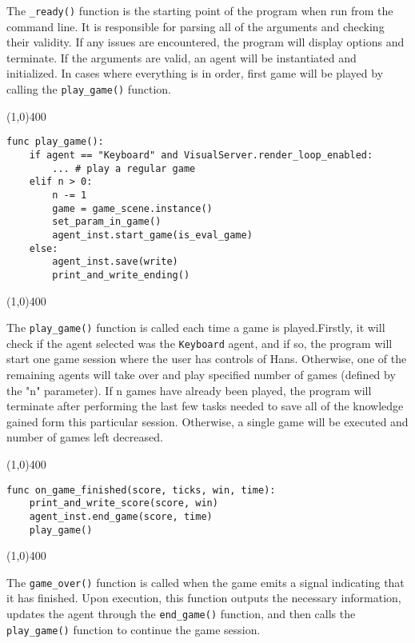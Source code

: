 The \texttt{\_ready()} function is the starting point of the program when run from the command line. It is responsible for parsing all of the arguments and checking their validity. If any issues are encountered, the program will display options and terminate. If the arguments are valid, an agent will be instantiated and initialized. In cases where everything is in order, first game will be played by calling the \texttt{play\_game()} function.

\begin{center}
\line(1,0){400}
\begin{lstlisting}
func play_game():
	if agent == "Keyboard" and VisualServer.render_loop_enabled:
		... # play a regular game
	elif n > 0:
		n -= 1
		game = game_scene.instance()
		set_param_in_game()
		agent_inst.start_game(is_eval_game)
	else:
		agent_inst.save(write)
		print_and_write_ending()
\end{lstlisting}
\line(1,0){400}
\end{center}

The \texttt{play\_game()} function is called each time a game is played.Firstly, it will check if the agent selected was the \texttt{Keyboard} agent, and if so, the program will start one game session where the user has controls of Hans. Otherwise, one of the remaining agents will take over and play specified number of games (defined by the "n" parameter). If n games have already been played, the program will terminate after performing the last few tasks needed to save all of the knowledge gained form this particular session. Otherwise, a single game will be executed and number of games left decreased.

\begin{center}
\line(1,0){400}
\begin{lstlisting}
func on_game_finished(score, ticks, win, time):
	print_and_write_score(score, win)
	agent_inst.end_game(score, time)
	play_game()
\end{lstlisting}
\line(1,0){400}
\end{center}



The \texttt{game\_over()} function is called when the game emits a signal indicating that it has finished. Upon execution, this function outputs the necessary information, updates the agent through the \texttt{end\_game()} function, and then calls the \texttt{play\_game()} function to continue the game session.